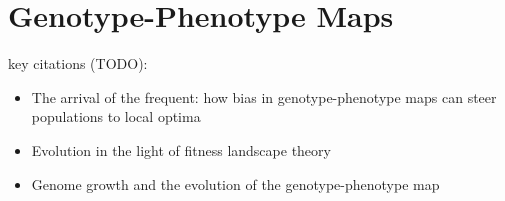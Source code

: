\section{Genotype-Phenotype Maps}

key citations (TODO):
\begin{itemize}
  \item The arrival of the frequent: how bias in genotype-phenotype maps can steer populations to local optima \citep{schaper2014arrival}
  \item Evolution in the light of fitness landscape theory \citep{fragata2019evolution}
  \item Genome growth and the evolution of the genotype-phenotype map \citep{altenberg1995genome}
\end{itemize}
